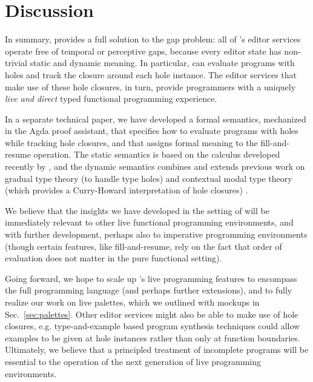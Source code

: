 \section{Discussion}
\label{sec:discussion}
In summary, \Hazel provides a full solution to the gap problem: all of \Hazel's
editor services operate free of temporal or perceptive gaps, because every editor state
has non-trivial static and dynamic meaning. In particular, \Hazel can evaluate programs with holes and track the closure around each hole instance. The editor services that make use of these hole closures, in turn, provide \Hazel programmers with a uniquely 
\emph{live and direct} typed functional programming experience. 

In a separate technical paper,
we have developed a formal semantics,
mechanized in the Agda proof assistant, that
specifies how to evaluate programs with holes while tracking hole closures, and that assigns formal meaning to the fill-and-resume operation. The static semantics is based on the \Hazelnut calculus developed recently by \citet{popl-paper}, and the dynamic semantics combines and extends previous work on gradual type theory (to handle type holes) \cite{Siek06a,DBLP:conf/snapl/SiekVCB15} and contextual modal type theory (which provides a Curry-Howard interpretation of hole closures) \cite{Nanevski2008}. 

We believe that the insights we have developed in the setting of 
\Hazel will be immediately relevant to other
live functional programming environments, and with further development,
perhaps also to imperative programming environments 
(though certain features, like fill-and-resume, rely on the fact
that order of evaluation does not matter in the pure functional 
setting). 

Going forward, we hope to scale up \Hazel's live programming features  to encompass the full \Elm{} programming language (and perhaps further extensions), and to fully realize our work on live palettes, which we  outlined with mockups in Sec.~\ref{sec:palettes}. 
Other editor services might also be able to make use of hole closures, e.g. type-and-example based program synthesis techniques \cite{Osera2015} could allow examples to be given at hole instances rather than only at function boundaries. 
Ultimately, we believe that a principled treatment of incomplete
programs will be essential to the operation of the next generation of live programming environments.
